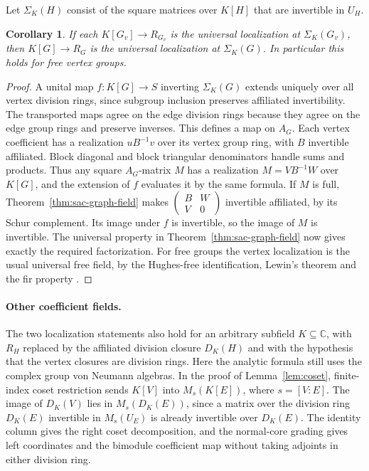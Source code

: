 \documentclass[11pt,a4paper,reqno]{amsart}
\numberwithin{equation}{section}
\newtheorem{corollary}[theorem]{Corollary}
\theoremstyle{remark}
\newcommand{\C}{\mathbb C}
\begin{document}
Let \(\Sigma_K(H)\) consist of the square matrices over \(K[H]\) that are invertible in \(U_H\).
\begin{corollary}\label{cor:sac-localization}
If each \(K[G_v]\to R_{G_v}\) is the universal localization at \(\Sigma_K(G_v)\), then \(K[G]\to R_G\) is the universal localization at \(\Sigma_K(G)\). In particular this holds for free vertex groups.
\end{corollary}
\begin{proof}
A unital map \(f:K[G]\to S\) inverting \(\Sigma_K(G)\) extends uniquely over all vertex division rings, since subgroup inclusion preserves affiliated invertibility. The transported maps agree on the edge division rings because they agree on the edge group rings and preserve inverses. This defines a map on \(A_G\). Each vertex coefficient has a realization \(uB^{-1}v\) over its vertex group ring, with \(B\) invertible affiliated. Block diagonal and block triangular denominators handle sums and products. Thus any square \(A_G\)-matrix \(M\) has a realization \(M=VB^{-1}W\) over \(K[G]\), and the extension of \(f\) evaluates it by the same formula. If \(M\) is full, Theorem~\ref{thm:sac-graph-field} makes \(\left(\begin{smallmatrix}B&W\\ V&0\end{smallmatrix}\right)\) invertible affiliated, by its Schur complement. Its image under \(f\) is invertible, so the image of \(M\) is invertible. The universal property in Theorem~\ref{thm:sac-graph-field} now gives exactly the required factorization. For free groups the vertex localization is the usual universal free field, by the Hughes-free identification, Lewin's theorem and the fir property \cite[\S4.2]{HennekeLopez}\cite[Theorem~1.1]{LewinFreeField}\cite[Corollaries~7.5.14 and~7.11.8]{CohnBook}.
\end{proof}

\paragraph{Other coefficient fields.}
The two localization statements also hold for an arbitrary subfield \(K\subseteq\C\), with \(R_H\) replaced by the affiliated division closure \(D_K(H)\) and with the hypothesis that the vertex closures are division rings. Here the analytic formula still uses the complex group von Neumann algebras. In the proof of Lemma~\ref{lem:coset}, finite-index coset restriction sends \(K[V]\) into \(M_s(K[E])\), where \(s=[V:E]\). The image of \(D_K(V)\) lies in \(M_s(D_K(E))\), since a matrix over the division ring \(D_K(E)\) invertible in \(M_s(U_E)\) is already invertible over \(D_K(E)\). The identity column gives the right coset decomposition, and the normal-core grading gives left coordinates and the bimodule coefficient map without taking adjoints in either division ring.
\end{document}
